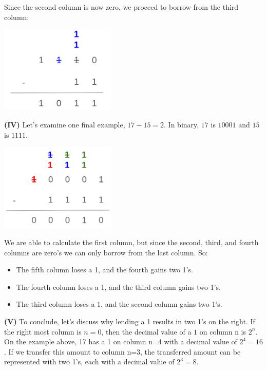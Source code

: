\documentclass[12pt]{article}
\begin{document}
		\hspace{0.45cm}
	\begin{minipage}[t]{.5\linewidth} 
					\par\noindent Since the second column is now zero, we proceed to borrow from the third column:
		\begin{center}
			\includegraphics[width=5.5cm]{bin-sub-3.png}
		\end{center}
	
	\par\noindent \textbf{(IV)} Let's examine one final example, \(17-15=2\). In binary, \(17\) is \(10001\) and \(15\) is \(1111\).
			\begin{center}
		\includegraphics[width=5.5cm]{bin-sub-4.png}
	\end{center}

	\par\noindent We are able to calculate the first column, but since the second, third, and fourth columns are zero's we can only borrow from the last column. So:
	
	\begin{itemize}
		\item The fifth column loses a 1, and the fourth gains two 1's.
		\item The fourth column loses a 1, and the third column gains two 1's.
		\item The third column loses a 1, and the second column gains two 1's.
	\end{itemize}
		\end{minipage}
	\newline
	\par\noindent \textbf{(V)} To conclude, let's discuss why lending a 1 results in two 1's on the right. If the right most column is \(n=0\), then the decimal value of a \(1\) on column n is \(2^n\). On the example above, 17 has a 1 on column n=4 with a decimal value of \(2^4 = 16\). If we transfer this amount to column n=3, the transferred amount can be represented with two 1's, each with a decimal value of \(2^3=8\).
	
\end{document}
